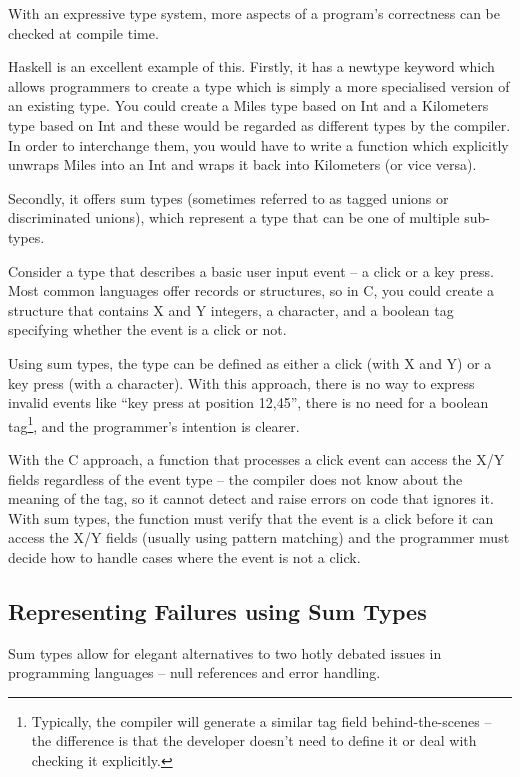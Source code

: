 \documentclass[11pt]{report}
\begin{document}
With an expressive type system, more aspects of a program's correctness can be checked at compile time.

Haskell is an excellent example of this\cite{HaskellTypeIntro}. Firstly, it has a newtype keyword which allows programmers to create a type which is simply a more specialised version of an existing type. You could create a Miles type based on Int and a Kilometers type based on Int and these would be regarded as different types by the compiler. In order to interchange them, you would have to write a function which explicitly unwraps Miles into an Int and wraps it back into Kilometers (or vice versa).

Secondly, it offers sum types (sometimes referred to as tagged unions or discriminated unions), which represent a type that can be one of multiple sub-types.

Consider a type that describes a basic user input event – a click or a key press. Most common languages offer records or structures, so in C, you could create a structure that contains X and Y integers, a character, and a boolean tag specifying whether the event is a click or not.

Using sum types, the type can be defined as either a click (with X and Y) or a key press (with a character). With this approach, there is no way to express invalid events like “key press at position 12,45”, there is no need for a boolean tag\footnote{Typically, the compiler will generate a similar tag field behind-the-scenes – the difference is that the developer doesn't need to define it or deal with checking it explicitly.}, and the programmer's intention is clearer.

With the C approach, a function that processes a click event can access the X/Y fields regardless of the event type – the compiler does not know about the meaning of the tag, so it cannot detect and raise errors on code that ignores it. With sum types, the function must verify that the event is a click before it can access the X/Y fields (usually using pattern matching) and the programmer must decide how to handle cases where the event is not a click.

\subsection{Representing Failures using Sum Types}

Sum types allow for elegant alternatives to two hotly debated issues in programming languages – null references and error handling.
\end{document}
